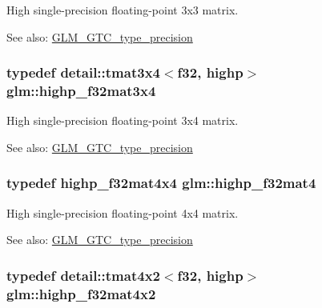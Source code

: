 High single-precision floating-point 3x3 matrix. \begin{Desc}
\item[See also:]\hyperlink{group__gtc__type__precision}{GLM\_\-GTC\_\-type\_\-precision} \end{Desc}
\hypertarget{group__gtc__type__precision_ga71f504ecb02f9178026b01013b77ba0}{
\subsubsection[highp\_\-f32mat3x4]{\setlength{\rightskip}{0pt plus 5cm}typedef detail::tmat3x4$<$f32, highp$>$ {\bf glm::highp\_\-f32mat3x4}}}
\label{group__gtc__type__precision_ga71f504ecb02f9178026b01013b77ba0}


High single-precision floating-point 3x4 matrix. \begin{Desc}
\item[See also:]\hyperlink{group__gtc__type__precision}{GLM\_\-GTC\_\-type\_\-precision} \end{Desc}
\hypertarget{group__gtc__type__precision_gc14c1bfb647e39d459c7489ede2156cc}{
\subsubsection[highp\_\-f32mat4]{\setlength{\rightskip}{0pt plus 5cm}typedef highp\_\-f32mat4x4 {\bf glm::highp\_\-f32mat4}}}
\label{group__gtc__type__precision_gc14c1bfb647e39d459c7489ede2156cc}


High single-precision floating-point 4x4 matrix. \begin{Desc}
\item[See also:]\hyperlink{group__gtc__type__precision}{GLM\_\-GTC\_\-type\_\-precision} \end{Desc}
\hypertarget{group__gtc__type__precision_g4d799497b303c2434fe709f81f6bd4dd}{
\subsubsection[highp\_\-f32mat4x2]{\setlength{\rightskip}{0pt plus 5cm}typedef detail::tmat4x2$<$f32, highp$>$ {\bf glm::highp\_\-f32mat4x2}}}
\label{group__gtc__type__precision_g4d799497b303c2434fe709f81f6bd4dd}


